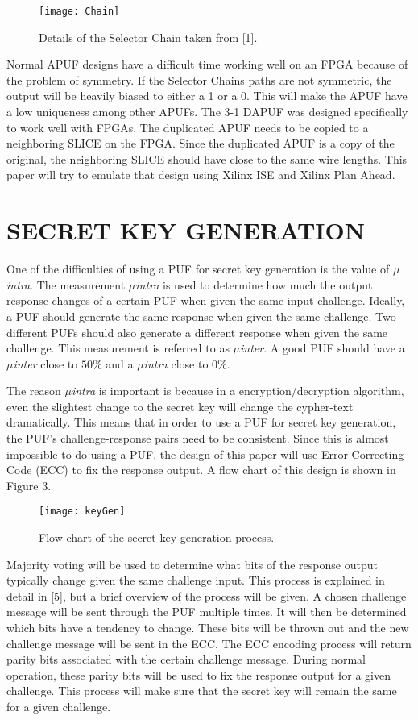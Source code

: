 \documentclass[letterpaper, 10 pt, conference]{ieeeconf}  %
\begin{document}
\begin{figure}[thpb]
	\centering
	\texttt{[image: Chain]}
   \caption{Details of the Selector Chain taken from [1].}
\end{figure}

Normal APUF designs have a difficult time working well on an FPGA because of the problem of symmetry. If the Selector Chains paths are not symmetric, the output will be heavily biased to either a 1 or a 0.  This will make the APUF have a low uniqueness among other APUFs.  The 3-1 DAPUF was designed specifically to work well with FPGAs.  The duplicated APUF needs to be copied to a neighboring SLICE on the FPGA.  Since the duplicated APUF is a copy of the original, the neighboring SLICE should have close to the same wire lengths.  This paper will try to emulate that design using Xilinx ISE and Xilinx Plan Ahead.

\section{SECRET KEY GENERATION}

One of the difficulties of using a PUF for secret key generation is the value of \emph{$\mu$intra}.  The measurement \emph{$\mu$intra} is used to determine how much the output response changes of a certain PUF when given the same input challenge.  Ideally, a PUF should generate the same response when given the same challenge.  Two different PUFs should also generate a different response when given the same challenge.  This measurement is referred to as \emph{$\mu$inter}.  A good PUF should have a \emph{$\mu$inter} close to $50\%$ and a \emph{$\mu$intra} close to $0\%$.

The reason \emph{$\mu$intra} is important is because in a encryption/decryption algorithm, even the slightest change to the secret key will change the cypher-text dramatically.  This means that in order to use a PUF for secret key generation, the PUF's challenge-response pairs need to be consistent.  Since this is almost impossible to do using a PUF, the design of this paper will use Error Correcting Code (ECC) to fix the response output.  A flow chart of this design is shown in Figure 3.

\begin{figure}[thpb]
	\centering
	\texttt{[image: keyGen]}
   \caption{Flow chart of the secret key generation process.}
\end{figure}

Majority voting will be used to determine what bits of the response output typically change given the same challenge input.  This process is explained in detail in [5], but a brief overview of the process will be given.  A chosen challenge message will be sent through the PUF multiple times.  It will then be determined which bits have a tendency to change.  These bits will be thrown out and the new challenge message will be sent in the ECC.  The ECC encoding process will return parity bits associated with the certain challenge message.  During normal operation, these parity bits will be used to fix the response output for a given challenge.  This process will make sure that the secret key will remain the same for a given challenge.
\end{document}

